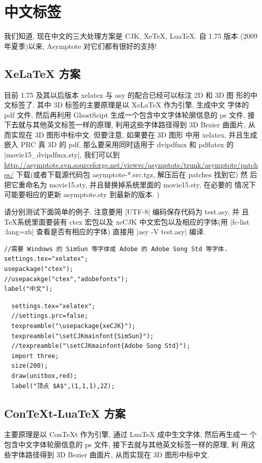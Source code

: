 \documentclass[nofonts,CJKnormalspaces]{ctexbook}
\begin{document}
\section{中文标签}
我们知道, 现在中文的三大处理方案是 CJK, XeTeX, LuaTeX. 自 1.75 版本
(2009 年夏季)以来, Asymptote 对它们都有很好的支持!

\subsection{XeLaTeX 方案}
目前 1.75 及其以后版本 xelatex 与 asy 的配合已经可以标注 2D 和 3D 图
形的中文标签了. 其中 3D 标签的主要原理是以 XeLaTeX 作为引擎, 生成中文
字体的 pdf 文件, 然后再利用 GhostScipt 生成一个包含中文字体轮廓信息的
ps 文件, 接下去就与其他英文标签一样的原理, 利用这些字体路径得到 3D
Bezier 曲面片, 从而实现在 3D 图形中标中文.  但要注意, 如果要在 3D 图形
中用 xelatex, 并且生成嵌入 PRC 真 3D 的 pdf, 那么要采用同时适用于
dvipdfmx 和 pdflatex 的 |movie15_dvipdfmx.sty|, 我们可以到
\url{http://asymptote.svn.sourceforge.net/viewvc/asymptote/trunk/asymptote/patches/}
下载(或者下载源代码包 asymptote-*.src.tgz, 解压后在 patches 找到它) 然
后把它重命名为 movie15.sty, 并且替换掉系统里面的 movie15.sty, 在必要的
情况下可能要相应的更新 asymptote.sty 到最新的版本.
\label{movie15:xelatex})

请分别测试下面简单的例子. 注意要用 |UTF-8| 编码保存代码为 test.asy, 并
且 \TeX 系统里面要装有 ctex 宏包以及 xeCJK 中文宏包以及相应的字体(用
|fc-list :lang=zh| 查看是否有相应的字体) 直接用
|asy -V test.asy| 编译.

\begin{lstlisting}
//需要 Windows 的 SimSun 等字体或 Adobe 的 Adobe Song Std 等字体.
settings.tex="xelatex";
usepackage("ctex");
//usepacakge("ctex","adobefonts");
label("中文");
\end{lstlisting}

\begin{lstlisting}
  settings.tex="xelatex";
  //settings.prc=false;
  texpreamble("\usepackage{xeCJK}");
  texpreamble("\setCJKmainfont{SimSun}");
  //texpreamble("\setCJKmainfont{Adobe Song Std}");
  import three;
  size(200);
  draw(unitbox,red);
  label("顶点 $A$",(1,1,1),2Z);
\end{lstlisting}


\subsection{ConTeXt-LuaTeX 方案}
主要原理是以 ConTeXt 作为引擎, 通过 LuaTeX 成中生文字体, 然后再生成一
个包含中文字体轮廓信息的 ps 文件, 接下去就与其他英文标签一样的原理, 利
用这些字体路径得到 3D Bezier 曲面片, 从而实现在 3D 图形中标中文.
\end{document}
